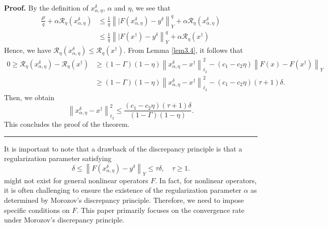 \documentclass[a4paper,12pt]{article}
\numberwithin{equation}{section}
\newenvironment{proof}[1][Proof]{\textbf{#1.} }
{\ \rule{0.75em}{0.75em}\smallskip}
\begin{document}
\begin{proof}
    By the definition of $x_{\alpha,\eta}^{\delta}$, $\alpha$ and $\eta$, we see that
    \begin{align}\label{equ3.19}
        \frac{\delta^{q}}{q}+\alpha\mathcal{R}_{\eta}\left(x_{\alpha,\eta}^{\delta}\right) & \leq \frac{1}{q}\left\||F\left(x_{\alpha,\eta}^{\delta}\right)- y^{\delta}\right\|_{Y}^{q} + \alpha\mathcal{R}_{\eta} \left(x_{\alpha,\eta}^{\delta}\right) \nonumber\\
        & \leq \frac{1}{q}\left\||F\left(x^{\dagger}\right)-y^{\delta}\right\|_{Y}^{q} + \alpha\mathcal{R}_{\eta}\left(x^{\dagger}\right)
    \end{align}
    Hence, we have $\mathcal{R}_{\eta}\left(x_{\alpha,\eta}^{\delta}\right)\leq \mathcal{R}_{\eta}\left(x^{\dagger}\right)$. From Lemma \ref{lem3.4}, it follows that 
    \begin{align}\label{equ3.20}
        0 \geq \mathcal{R}_{\eta}\left(x_{\alpha,\eta}^{\delta}\right) - \mathcal{R}_{\eta}\left(x^{\dagger}\right)
        & \geq \left(1-\Gamma\right)\left(1-\eta\right) \left\|x_{\alpha,\eta}^{\delta}-x^{\dagger}\right\|_{\ell_{2}}^{2}- \left(c_{1}-c_{2}\eta\right) \left\|F\left(x\right)-F\left(x^{\dagger}\right)\right\|_{Y} \nonumber\\
        & \geq \left(1-\Gamma\right)\left(1-\eta\right) \left\|x_{\alpha,\eta}^{\delta}-x^{\dagger}\right\|_{\ell_{2}}^{2}- \left(c_{1}-c_{2}\eta\right)\left(\tau+1\right)\delta.
    \end{align}
    Then, we obtain
    \begin{equation*}
        \left\|x_{\alpha,\eta}^{\delta}-x^{\dagger}\right\|_{\ell_{2}}^{2}\leq \frac{\left(c_{1}-c_{2}\eta\right)\left(\tau+1\right)\delta} {\left(1-\Gamma\right)\left(1-\eta\right)}.
    \end{equation*}
    This concludes the proof of the theorem.
\end{proof}

\par It is important to note that a drawback of the discrepancy principle is that a regularization parameter satisfying
\begin{equation*}
    \delta\leq\left\|F\left(x_{\alpha,\eta}^{\delta}\right)-y^{\delta}\right\|_{Y} \leq \tau\delta,\quad \tau\geq 1.
\end{equation*}
might not exist for general nonlinear operators $F$. In fact, for nonlinear operators, it is often challenging to ensure the existence of the regularization parameter $\alpha$ as determined by Morozov's discrepancy principle. Therefore, we need to impose specific conditions on $F$. This paper primarily focuses on the convergence rate under Morozov's discrepancy principle. 
\end{document}
